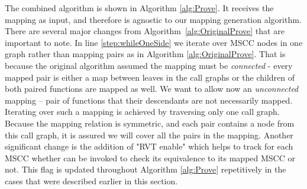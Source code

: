 The combined algorithm is shown in Algorithm \ref{alg:Prove}. It receives the mapping as input, and therefore is agnostic to our mapping generation algorithm. There are several major changes from Algorithm~\ref{alg:OriginalProve} that are important to note. In line \ref{step:whileOneSide} we iterate over MSCC nodes in one graph rather than mapping pairs as in Algorithm \ref{alg:OriginalProve}. That is because the original algorithm assumed the mapping must be \emph{connected} - every mapped pair is either a map between leaves in the call graphs or the children of both paired functions are mapped as well. We want to allow now an \emph{unconnected} mapping – pair of functions that their descendants are not necessarily mapped. Iterating over such a mapping is achieved by traversing only one call graph. Because the mapping relation is symmetric, and each pair contains a node from this call graph, it is assured we will cover all the pairs in the mapping. Another significant change is the addition of "RVT enable" which helps to track for each MSCC whether  can be invoked to check its equivalence to its mapped MSCC or not. This flag is updated throughout Algorithm \ref{alg:Prove} repetitively in the cases that were described earlier in this section.  

